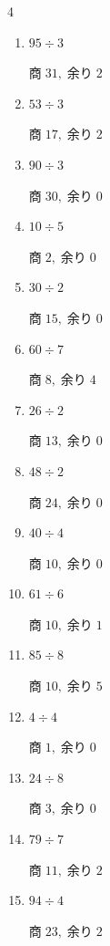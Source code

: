 \begin{multicols}{4}
\begin{enumerate}
        $商\; 4,\; 余り\; 7$

  \item $95 \div 3$

        $商\; 31,\; 余り\; 2$

  \item $53 \div 3$

        $商\; 17,\; 余り\; 2$

  \item $90 \div 3$

        $商\; 30,\; 余り\; 0$

  \item $10 \div 5$

        $商\; 2,\; 余り\; 0$

  \item $30 \div 2$

        $商\; 15,\; 余り\; 0$

  \item $60 \div 7$

        $商\; 8,\; 余り\; 4$

  \item $26 \div 2$

        $商\; 13,\; 余り\; 0$

  \item $48 \div 2$

        $商\; 24,\; 余り\; 0$

  \item $40 \div 4$

        $商\; 10,\; 余り\; 0$

  \item $61 \div 6$

        $商\; 10,\; 余り\; 1$

  \item $85 \div 8$

        $商\; 10,\; 余り\; 5$

  \item $4 \div 4$

        $商\; 1,\; 余り\; 0$

  \item $24 \div 8$

        $商\; 3,\; 余り\; 0$

  \item $79 \div 7$

        $商\; 11,\; 余り\; 2$

  \item $94 \div 4$

        $商\; 23,\; 余り\; 2$


\end{enumerate}
\end{multicols}
